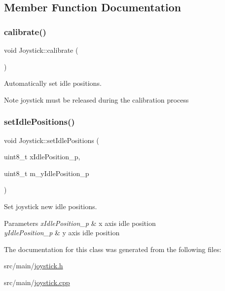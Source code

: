 \subsection{Member Function Documentation}
\mbox{\label{class_joystick_ae2a8edfcf0aa98fba3e4bfb31ebc8200}} 
\subsubsection{\texorpdfstring{calibrate()}{calibrate()}}
{\footnotesize\ttfamily void Joystick\+::calibrate (\begin{DoxyParamCaption}{ }\end{DoxyParamCaption})}



Automatically set idle positions. 

\begin{DoxyNote}{Note}
joystick must be released during the calibration process 
\end{DoxyNote}
\mbox{\label{class_joystick_a70f101e3395a939fb757522b14d830c9}} 
\subsubsection{\texorpdfstring{set\+Idle\+Positions()}{setIdlePositions()}}
{\footnotesize\ttfamily void Joystick\+::set\+Idle\+Positions (\begin{DoxyParamCaption}\item[{uint8\+\_\+t}]{x\+Idle\+Position\+\_\+p,  }\item[{uint8\+\_\+t}]{m\+\_\+y\+Idle\+Position\+\_\+p }\end{DoxyParamCaption})}



Set joystick new idle positions. 


\begin{DoxyParams}{Parameters}
{\em x\+Idle\+Position\+\_\+p} & x axis idle position \\
\hline
{\em y\+Idle\+Position\+\_\+p} & y axis idle position \\
\hline
\end{DoxyParams}


The documentation for this class was generated from the following files\+:\begin{DoxyCompactItemize}
\item 
src/main/\hyperlink{joystick_8h}{joystick.\+h}\item 
src/main/\hyperlink{joystick_8cpp}{joystick.\+cpp}\end{DoxyCompactItemize}
